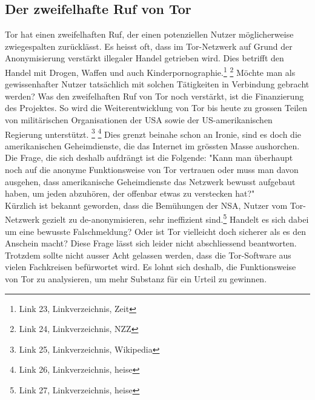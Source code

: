 \subsection{Der zweifelhafte Ruf von Tor}
Tor hat einen zweifelhaften Ruf, der einen potenziellen Nutzer möglicherweise zwiegespalten zurücklässt.
Es heisst oft, dass im Tor-Netzwerk auf Grund der Anonymisierung verstärkt illegaler Handel getrieben wird.
Dies betrifft den Handel mit Drogen, Waffen und auch Kinderpornographie.\footnote{Link 23, Linkverzeichnis, Zeit} \footnote{Link 24, Linkverzeichnis, NZZ}
Möchte man als gewissenhafter Nutzer tatsächlich mit solchen Tätigkeiten in Verbindung gebracht werden?
Was den zweifelhaften Ruf von Tor noch verstärkt, ist die Finanzierung des Projektes.
So wird die Weiterentwicklung von Tor bis heute zu grossen Teilen von militärischen Organisationen der USA sowie der US-amerikanischen Regierung  unterstützt.
\footnote{Link 25, Linkverzeichnis, Wikipedia}
\footnote{Link 26, Linkverzeichnis, heise}
Dies grenzt beinahe schon an Ironie, sind es doch die amerikanischen Geheimdienste, die das Internet im grössten Masse aushorchen. Die Frage, die sich deshalb aufdrängt ist die Folgende: "Kann man überhaupt noch auf die anonyme Funktionsweise von Tor vertrauen oder muss man davon ausgehen, dass amerikanische Geheimdienste das Netzwerk bewusst aufgebaut haben, um jeden abzuhören, der offenbar etwas zu verstecken hat?"
\\
Kürzlich ist bekannt geworden, dass die Bemühungen der NSA, Nutzer vom Tor-Netzwerk gezielt zu de-anonymisieren, sehr ineffizient sind.\footnote{Link 27, Linkverzeichnis, heise}
Handelt es sich dabei um eine bewusste Falschmeldung? Oder ist Tor vielleicht doch sicherer als es den Anschein macht? Diese Frage lässt sich leider nicht abschliessend beantworten. Trotzdem sollte nicht ausser Acht gelassen werden, dass die Tor-Software aus vielen Fachkreisen befürwortet wird. Es lohnt sich deshalb, die Funktionsweise von Tor zu analysieren, um mehr Substanz für ein Urteil zu gewinnen.

